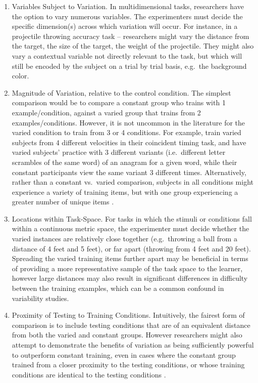 \documentclass[
  12pt,
  letterpaper,
]{article}
\begin{document}
\begin{enumerate}
\def\labelenumi{\arabic{enumi})}
\item
  Variables Subject to Variation. In multidimensional tasks, researchers
  have the option to vary numerous variables. The experimenters must
  decide the specific dimension(s) across which variation will occur.
  For instance, in a projectile throwing accuracy task -- researchers
  might vary the distance from the target, the size of the target, the
  weight of the projectile. They might also vary a contextual variable
  not directly relevant to the task, but which will still be encoded by
  the subject on a trial by trial basis, e.g.~the background color.
\item
  Magnitude of Variation, relative to the control condition. The
  simplest comparison would be to compare a constant group who trains
  with 1 example/condition, against a varied group that trains from 2
  examples/conditions. However, it is not uncommon in the literature for
  the varied condition to train from 3 or 4 conditions. For example,
  \textcite{catalanoDistantTransferCoincident1984a} train varied
  subjects from 4 different velocities in their coincident timing task,
  and \autocite{goodeSuperiorityVariableRepeated2008} have varied
  subjects' practice with 3 different variants (i.e.~different letter
  scrambles of the same word) of an anagram for a given word, while
  their constant participants view the same variant 3 different times.
  Alternatively, rather than a constant vs.~varied comparison, subjects
  in all conditions might experience a variety of training items, but
  with one group experiencing a greater number of unique items
  \autocite{nosofskyModelguidedSearchOptimal2018}.
\item
  Locations within Task-Space. For tasks in which the stimuli or
  conditions fall within a continuous metric space, the experimenter
  must decide whether the varied instances are relatively close together
  (e.g.~throwing a ball from a distance of 4 feet and 5 feet), or far
  apart (throwing from 4 feet and 20 feet). Spreading the varied
  training items further apart may be beneficial in terms of providing a
  more representative sample of the task space to the learner, however
  large distances may also result in significant differences in
  difficulty between the training examples, which can be a common
  confound in variability studies.
\item
  Proximity of Testing to Training Conditions. Intuitively, the fairest
  form of comparison is to include testing conditions that are of an
  equivalent distance from both the varied and constant groups. However
  researchers might also attempt to demonstrate the benefits of
  variation as being sufficiently powerful to outperform constant
  training, even in cases where the constant group trained from a closer
  proximity to the testing conditions, or whose training conditions are
  identical to the testing conditions
  \autocite{goodeSuperiorityVariableRepeated2008,kerrSpecificVariedPractice1978}.
\end{enumerate}
\end{document}
